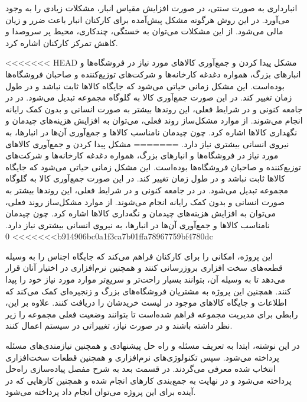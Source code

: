 انبارداری به صورت سنتی، در صورت افزایش مقیاس انبار، مشکلات زیادی را به وجود می‌آورد. در این روش هرگونه مشکل پیش‌آمده برای کارکنان انبار باعث ضرر و زیان مالی می‌شود. از این مشکلات می‌توان به خستگی، چندکاری، محیط پر سروصدا و کاهش تمرکز کارکنان اشاره کرد.
 
 
<<<<<<< HEAD
مشکل پیدا کردن و جمع‌آوری کالاهای مورد نیاز در فروشگاه‌ها و انبارهای بزرگ، همواره دغدغه کارخانه‌ها و شرکت‌های توزیع‌کننده و صاحبان فروشگاه‌ها بوده‌است. این مشکل زمانی حیاتی می‌شود که جایگاه کالاها ثابت نباشد و در طول زمان تغییر کند. در این صورت جمع‌آوری کالا به گلوگاه مجموعه تبدیل می‌شود. در در جامعه کنونی و در شرایط فعلی، این روندها بیشتر به صورت انسانی و بدون کمک رایانه انجام می‌شوند. از موارد مشکل‌ساز روند فعلی، می‌توان به افزایش هزینه‌های چیدمان و نگهداری کالاها اشاره کرد. چون چیدمان نامناسب کالاها و جمع‌آوری آن‌ها در انبارها، به نیروی انسانی بیشتری نیاز دارد.
=======
مشکل پیدا کردن و جمع‌آوری کالاهای مورد نیاز در فروشگاه‌ها و انبارهای بزرگ، همواره دغدغه کارخانه‌ها و شرکت‌های توزیع‌کننده و صاحبان فروشگاه‌ها بوده‌است. این مشکل زمانی حیاتی می‌شود که جایگاه کالاها ثابت نباشد و در طول زمان تغییر کند. در این صورت جمع‌آوری کالا به گلوگاه مجموعه تبدیل می‌شود. در در جامعه کنونی و در شرایط فعلی، این روندها بیشتر به صورت انسانی و بدون کمک رایانه انجام می‌شوند. از موارد مشکل‌ساز روند فعلی، می‌توان به افزایش هزینه‌های چیدمان و نگه‌داری کالاها اشاره کرد. چون چیدمان نامناسب کالاها و جمع‌آوری آن‌ها در انبارها، به نیروی انسانی بیشتری نیاز دارد.
>>>>>>> 0b914906bc0a1f3ca7b01ffa78967759bf4780dc
 
این پروژه، امکانی را برای کارکنان فراهم می‌کند که جایگاه اجناس را به وسیله قطعه‌های سخت افزاری بروزرسانی کنند و همچنین نرم‌افزاری در اختیار آنان قرار می‌دهد تا به وسیله آن، بتوانند بسیار راحت‌تر و سریع‌تر موارد مورد نیاز خود را پیدا کنند. همچنین این پروژه به مشتریان فروشگاه‌های بزرگ و زنجیره‌ای کمک می‌کند که اطلاعات و جایگاه کالاهای موجود در لیست خریدشان را دریافت کنند. علاوه بر این، رابطی برای مدیریت مجموعه فراهم شده‌است تا بتوانند وضعیت فعلی مجموعه را زیر نظر داشته باشند و در صورت نیاز، تغییراتی در سیستم اعمال کنند.
 
در این نوشته، ابتدا به تعریف مسئله و راه حل پیشنهادی و همچنین نیازمندی‌های مسئله پرداخته می‌شود. سپس تکنولوژی‌های نرم‌افزاری و همچنین قطعات سخت‌افزاری انتخاب شده معرفی می‌گردند. در قسمت بعد به شرح مفصل پیاده‌سازی راه‌حل پرداخته می‌شود و در نهایت به جمع‌بندی کارهای انجام شده و همچنین کارهایی که در آینده برای این پروژه می‌توان انجام داد پرداخته می‌شود.